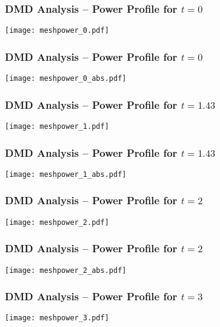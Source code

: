 \documentclass[fleqn]{beamer}
\begin{document}
\begin{frame}
\frametitle{DMD Analysis -- Power Profile for $t = 0$}

\texttt{[image: meshpower\_0.pdf]}

\end{frame}

\begin{frame}
\frametitle{DMD Analysis -- Power Profile for $t = 0$}

\texttt{[image: meshpower\_0\_abs.pdf]}

\end{frame}

\begin{frame}
\frametitle{DMD Analysis -- Power Profile for $t = 1.43$}

\texttt{[image: meshpower\_1.pdf]}

\end{frame}

\begin{frame}
\frametitle{DMD Analysis -- Power Profile for $t = 1.43$}

\texttt{[image: meshpower\_1\_abs.pdf]}

\end{frame}

\begin{frame}
\frametitle{DMD Analysis -- Power Profile for $t = 2$}

\texttt{[image: meshpower\_2.pdf]}

\end{frame}

\begin{frame}
\frametitle{DMD Analysis -- Power Profile for $t = 2$}

\texttt{[image: meshpower\_2\_abs.pdf]}

\end{frame}

\begin{frame}
\frametitle{DMD Analysis -- Power Profile for $t = 3$}

\texttt{[image: meshpower\_3.pdf]}
 
\end{frame}
\end{document}
